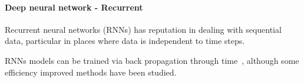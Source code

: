 \paragraph{Deep neural network - Recurrent}
Recurrent neural networks (RNNs) has reputation in dealing with sequential data, particular in places where data is independent to time steps. 


RNNs models can be trained via back propagation through time~\cite{Goodfellow-et-al-2016}, although some efficiency improved methods have been studied.~\cite{963769,neco.1989,Gomez:2008:ANE:1390681.1390712}
